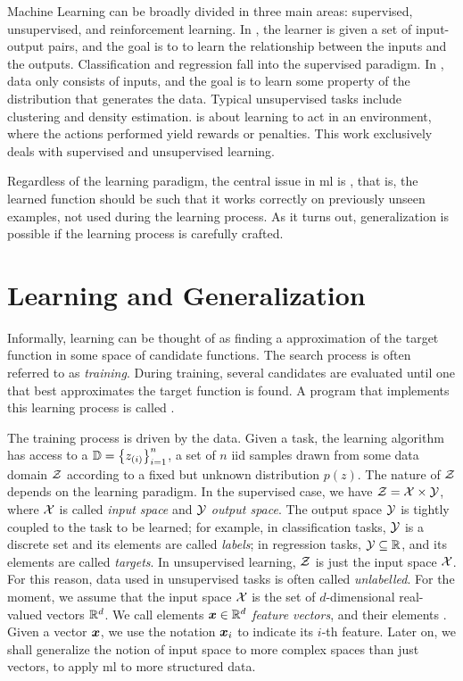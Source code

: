 Machine Learning can be broadly divided in three main areas: supervised, unsupervised, and reinforcement learning. In , the learner is given a set of input-output pairs, and the goal is to to learn the relationship between the inputs and the outputs. Classification and regression fall into the supervised paradigm. In , data only consists of inputs, and the goal is to learn some property of the distribution that generates the data. Typical unsupervised tasks include clustering and density estimation.  \citep{sutton1998rl} is about learning to act in an environment, where the actions performed yield rewards or penalties. This work exclusively deals with supervised and unsupervised learning.

Regardless of the learning paradigm, the central issue in \gls{ml} is , that is, the learned function should be such that it works correctly on previously unseen examples, not used during the learning process. As it turns out, generalization is possible if the learning process is carefully crafted.

\section{Learning and Generalization}\label{sec:learning}
Informally, learning can be thought of as finding a  approximation of the target function in some space of candidate functions. The search process is often referred to as \emph{training}. During training, several candidates are evaluated until one that best approximates the target function is found. A program that implements this learning process is called .

The training process is driven by the data. Given a task, the learning algorithm has access to a  $\mathbb{D} = \left\{ z_{(i)} \right\}_{i=1}^n$, a set of $n$ \gls{iid} samples drawn from some data domain $\Cal{Z}$ according to a fixed but unknown distribution $p(z)$. The nature of $\Cal{Z}$ depends on the learning paradigm. In the supervised case, we have $\Cal{Z} = \Cal{X} \times \Cal{Y}$, where $\Cal{X}$ is called \emph{input space} and $\Cal{Y}$ \emph{output space}. The output space $\Cal{Y}$ is tightly coupled to the task to be learned; for example, in classification tasks, $\Cal{Y}$ is a discrete set and its elements are called \emph{labels}; in regression tasks, $\Cal{Y} \subseteq \Real$, and its elements are called \emph{targets}. In unsupervised learning, $\Cal{Z}$ is just the input space $\Cal{X}$. For this reason, data used in unsupervised tasks is often called \emph{unlabelled}. For the moment, we assume that the input space $\Cal{X}$ is the set of $d$-dimensional real-valued vectors $\mathbb{R}^d$. We call elements $\Vector{x} \in \Real^d$  \emph{feature vectors}, and their elements . Given a vector $\Vector{x}$, we use the notation $\Feature{x}{i}$ to indicate its $i$-th feature. Later on, we shall generalize the notion of input space to more complex spaces than just vectors, to apply \gls{ml} to more structured data.

